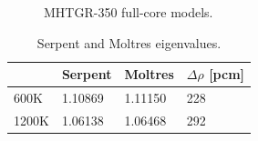 \documentclass[11pt,letterpaper]{article}
\begin{document}
\begin{figure}[htbp!]
	\centering
	\hfill
  \caption{MHTGR-350 full-core models.}
	\label{fig:fullcoremodel}
\end{figure}

\begin{table}[htbp!]
  \centering
  \caption{Serpent and Moltres eigenvalues.}
  \begin{tabular}{l|lll}
  \toprule
              & Serpent			& Moltres  & $\Delta \rho$ [pcm] 	\\
  \midrule
			 600K  	& 1.10869     & 1.11150	 &	228		\\
			1200K 	& 1.06138     & 1.06468	 &	292   \\

  \bottomrule
  \end{tabular}
  \label{tab:full-keff}
\end{table}
\end{document}
